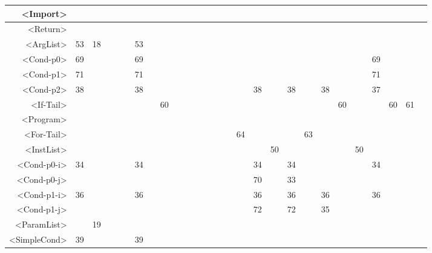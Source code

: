\begin{tabular}{r|c@{ }c@{ }c@{ }c@{ }c@{ }c@{ }c@{ }c@{ }c@{ }c@{ }c@{ }c@{ }c@{ }c@{ }c@{ }c@{ }c@{ }c@{ }c@{ }c@{ }c@{ }c@{ }c@{ }c@{ }c@{ }c@{ }c@{ }}
<Import> &   &   &   &   &   &   &   &   &   &   &   &   &   &   &   &   &   &   &   &   &   &   &   &   &   &   &   \\\hline
<Return> &   &   &   &   &   &   &   &   &   &   &   &   &   &   &   &   &   &   &   &   &   &   &   &   &   &   &   \\\hline
<ArgList> & 53 & 18 &   &   &   & 53 &   &   &   &   &   &   &   &   &   &   &   &   &   &   &   &   &   &   &   &   &   \\\hline
<Cond-p0> & 69 &   &   &   &   & 69 &   &   &   &   &   &   &   &   &   &   &   &   &   &   &   &   &   & 69 &   &   &   \\\hline
<Cond-p1> & 71 &   &   &   &   & 71 &   &   &   &   &   &   &   &   &   &   &   &   &   &   &   &   &   & 71 &   &   &   \\\hline
<Cond-p2> & 38 &   &   &   &   & 38 &   &   &   &   &   &   &   &   &   &   & 38 &   & 38 &   & 38 &   &   & 37 &   &   &   \\\hline
<If-Tail> &   &   &   &   &   &   &   & 60 &   &   &   &   &   &   &   &   &   &   &   &   &   & 60 &   &   & 60 & 61 &   \\\hline
<Program> &   &   &   &   &   &   &   &   &   &   &   &   &   &   &   &   &   &   &   &   &   &   &   &   &   &   &   \\\hline
<For-Tail> &   &   &   &   &   &   &   &   &   &   &   &   &   &   &   & 64 &   &   &   & 63 &   &   &   &   &   &   &   \\\hline
<InstList> &   &   &   &   &   &   &   &   &   &   &   &   &   &   &   &   &   & 50 &   &   &   &   & 50 &   &   &   &   \\\hline
<Cond-p0-i> & 34 &   &   &   &   & 34 &   &   &   &   &   &   &   &   &   &   & 34 &   & 34 &   &   &   &   & 34 &   &   &   \\\hline
<Cond-p0-j> &   &   &   &   &   &   &   &   &   &   &   &   &   &   &   &   & 70 &   & 33 &   &   &   &   &   &   &   &   \\\hline
<Cond-p1-i> & 36 &   &   &   &   & 36 &   &   &   &   &   &   &   &   &   &   & 36 &   & 36 &   & 36 &   &   & 36 &   &   &   \\\hline
<Cond-p1-j> &   &   &   &   &   &   &   &   &   &   &   &   &   &   &   &   & 72 &   & 72 &   & 35 &   &   &   &   &   &   \\\hline
<ParamList> &   & 19 &   &   &   &   &   &   &   &   &   &   &   &   &   &   &   &   &   &   &   &   &   &   &   &   &   \\\hline
<SimpleCond> & 39 &   &   &   &   & 39 &   &   &   &   &   &   &   &   &   &   &   &   &   &   &   &   &   &   &   &   &   \\\hline

\end{tabular}
